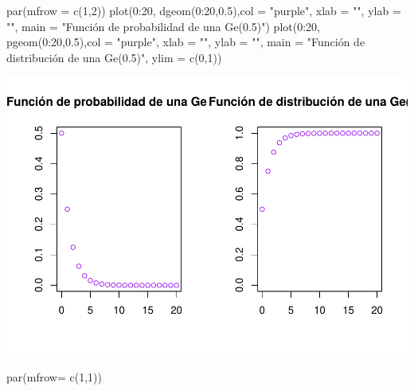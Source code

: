 \documentclass[
]{article}
\newenvironment{Shaded}{\begin{snugshade}}{\end{snugshade}}
\newcommand{\AttributeTok}[1]{\textcolor[rgb]{0.77,0.63,0.00}{#1}}
\newcommand{\DecValTok}[1]{\textcolor[rgb]{0.00,0.00,0.81}{#1}}
\newcommand{\FloatTok}[1]{\textcolor[rgb]{0.00,0.00,0.81}{#1}}
\newcommand{\FunctionTok}[1]{\textcolor[rgb]{0.00,0.00,0.00}{#1}}
\newcommand{\NormalTok}[1]{#1}
\newcommand{\SpecialCharTok}[1]{\textcolor[rgb]{0.00,0.00,0.00}{#1}}
\newcommand{\StringTok}[1]{\textcolor[rgb]{0.31,0.60,0.02}{#1}}
\begin{document}
\begin{Shaded}
\begin{Highlighting}[]
\FunctionTok{par}\NormalTok{(}\AttributeTok{mfrow =} \FunctionTok{c}\NormalTok{(}\DecValTok{1}\NormalTok{,}\DecValTok{2}\NormalTok{))}
\FunctionTok{plot}\NormalTok{(}\DecValTok{0}\SpecialCharTok{:}\DecValTok{20}\NormalTok{, }\FunctionTok{dgeom}\NormalTok{(}\DecValTok{0}\SpecialCharTok{:}\DecValTok{20}\NormalTok{,}\FloatTok{0.5}\NormalTok{),}\AttributeTok{col =} \StringTok{"purple"}\NormalTok{, }\AttributeTok{xlab =} \StringTok{""}\NormalTok{, }\AttributeTok{ylab =} \StringTok{""}\NormalTok{, }\AttributeTok{main =} \StringTok{"Función de probabilidad de una Ge(0.5)"}\NormalTok{)}
\FunctionTok{plot}\NormalTok{(}\DecValTok{0}\SpecialCharTok{:}\DecValTok{20}\NormalTok{, }\FunctionTok{pgeom}\NormalTok{(}\DecValTok{0}\SpecialCharTok{:}\DecValTok{20}\NormalTok{,}\FloatTok{0.5}\NormalTok{),}\AttributeTok{col =} \StringTok{"purple"}\NormalTok{, }\AttributeTok{xlab =} \StringTok{""}\NormalTok{, }\AttributeTok{ylab =} \StringTok{""}\NormalTok{, }\AttributeTok{main =} \StringTok{"Función de distribución de una Ge(0.5)"}\NormalTok{, }\AttributeTok{ylim =} \FunctionTok{c}\NormalTok{(}\DecValTok{0}\NormalTok{,}\DecValTok{1}\NormalTok{))}
\end{Highlighting}
\end{Shaded}

\includegraphics{Teoria4_files/figure-latex/Distribucion Geometrica-1.pdf}

\begin{Shaded}
\begin{Highlighting}[]
\FunctionTok{par}\NormalTok{(}\AttributeTok{mfrow=} \FunctionTok{c}\NormalTok{(}\DecValTok{1}\NormalTok{,}\DecValTok{1}\NormalTok{))}
\end{Highlighting}
\end{Shaded}
\end{document}
